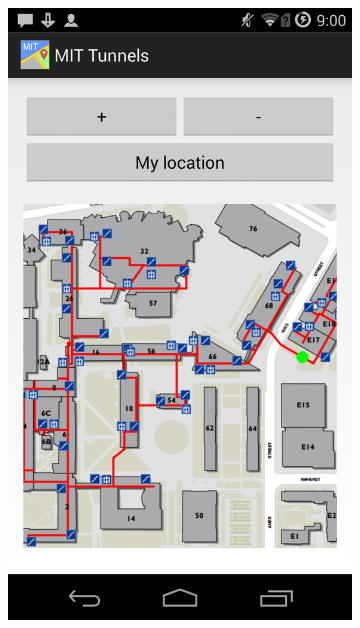 \documentclass[11pt]{article}
\begin{document}
\begin{figure}[h]
\centering
\begin{subfigure}[b]{0.45\textwidth}
\includegraphics[width=\textwidth]{ScreenshotTunnels1}
\label{fig:app1}
\end{subfigure}%
\qquad \quad
\begin{subfigure}[b]{0.45\textwidth}

\end{subfigure}
\end{figure}
\end{document}
